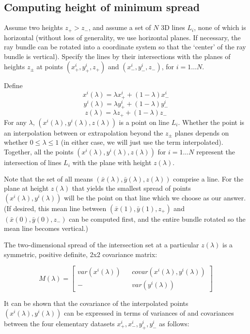 \documentclass[10pt]{amsart}
\begin{document}
\subsection{Computing height of minimum spread\label{poly}}
Assume two heights $z_{+} > z_{-}$, and assume a set of $N$ 3D lines $L_i$, none
of which is horizontal (without loss of generality, we use horizontal planes. If
necessary, the ray bundle can be rotated into a coordinate system so that the
`center' of the ray bundle is vertical). Specify the lines by their
intersections with the planes of heights $z_\pm$ at points
$(x_{+}^{i},y_{+}^{i}, z_+)$ and $(x_{-}^{i},y_{-}^{i}, z_-)$, for $i=1\ldots
N$.

Define
$$x^i(\lambda) = \lambda x^i_+ + (1-\lambda) x^i_-$$
$$y^i(\lambda) = \lambda y^i_+ + (1-\lambda) y^i_-$$
$$z(\lambda) = \lambda z_+ + (1-\lambda) z_-$$ For any $\lambda$,
$(x^i(\lambda), y^i(\lambda), z(\lambda))$ is a point on line $L_i$. Whether the
point is an interpolation between or extrapolation beyond the $z_\pm$ planes
depends on whether $0\le\lambda\le 1$ (in either case, we will just use the term
interpolated). Together, all the points $(x^i(\lambda), y^i(\lambda),
z(\lambda))$ for $i=1\ldots N$ represent the intersection of lines $L_i$ with
the plane with height $z(\lambda)$.

Note that the set of all means $(\bar{x}(\lambda),\bar{y}(\lambda),z(\lambda))$
comprise a line. For the plane at height $z(\lambda)$ that yields the smallest
spread of points $(x^i(\lambda),y^i(\lambda))$ will be the point on that line
which we choose as our answer. (If desired, this mean line between $(\bar{x}(1),
\bar{y}(1),z_+)$ and $(\bar{x}(0),\bar{y}(0),z_-)$ can be computed first, and
the entire bundle rotated so the mean line becomes vertical.)

The two-dimensional spread of the intersection set at a particular $z(\lambda)$
is a symmetric, positive definite, 2x2 covariance matrix:

\[M(\lambda) =
\begin{bmatrix}
 var(x^i(\lambda)) && covar(x^i(\lambda),y^i(\lambda)) \\
  -                && var(y^i(\lambda))
\end{bmatrix}
\]

It can be shown that the covariance of the interpolated points
$(x^i(\lambda), y^i(\lambda))$ can be expressed in terms of variances of and
covariances between the four elementary datasets $x^i_+, x^i_-, y^i_+, y^i_-$ as
follows:
\end{document}
